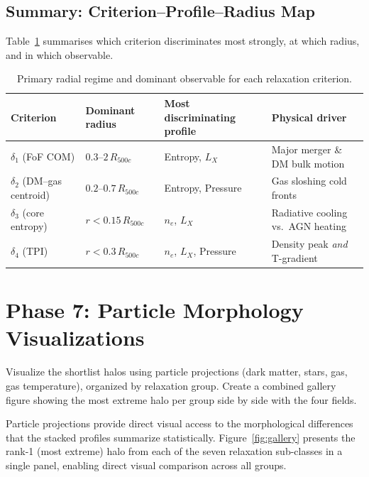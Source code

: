 \documentclass[12pt,a4paper]{article}
\begin{document}
\subsection{Summary: Criterion--Profile--Radius Map}

Table~\ref{tab:profile_radius} summarises which criterion discriminates most strongly,
at which radius, and in which observable.

\begin{table}[htbp]
\centering
\caption{Primary radial regime and dominant observable for each relaxation criterion.}
\label{tab:profile_radius}
\begin{tabular}{llll}
\toprule
Criterion & Dominant radius & Most discriminating profile & Physical driver \\
\midrule
$\delta_1$ (FoF COM) & $0.3$--$2\,R_{500c}$ & Entropy, $L_X$ & Major merger \& DM bulk motion \\
$\delta_2$ (DM--gas centroid) & $0.2$--$0.7\,R_{500c}$ & Entropy, Pressure & Gas sloshing cold fronts \\
$\delta_3$ (core entropy) & $r < 0.15\,R_{500c}$ & $n_e$, $L_X$ & Radiative cooling vs.\ AGN heating \\
$\delta_4$ (TPI) & $r < 0.3\,R_{500c}$ & $n_e$, $L_X$, Pressure & Density peak \emph{and} T-gradient \\
\bottomrule
\end{tabular}
\end{table}

\section{Phase 7: Particle Morphology Visualizations}
\label{sec:phase7}

\begin{querybox}
Visualize the shortlist halos using particle projections (dark matter, stars, gas, gas
temperature), organized by relaxation group.  Create a combined gallery figure showing the
most extreme halo per group side by side with the four fields.
\end{querybox}

\noindent
Particle projections provide direct visual access to the morphological differences that
the stacked profiles summarize statistically.  Figure~\ref{fig:gallery} presents the
rank-1 (most extreme) halo from each of the seven relaxation sub-classes in a single
panel, enabling direct visual comparison across all groups.
\end{document}
